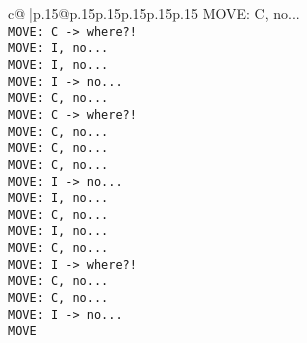 \documentclass{article}
\begin{document}
{\begin{supertabular}{c@{$\;$}|p{.15\linewidth}@{}p{.15\linewidth}p{.15\linewidth}p{.15\linewidth}p{.15\linewidth}p{.15\linewidth}}
{{{ MOVE: C, no...\\ \tt  MOVE: C -> where?!\\ \tt  MOVE: I, no...\\ \tt  MOVE: I, no...\\ \tt  MOVE: I -> no...\\ \tt  MOVE: C, no...\\ \tt  MOVE: C -> where?!\\ \tt  MOVE: C, no...\\ \tt  MOVE: C, no...\\ \tt  MOVE: C, no...\\ \tt  MOVE: I -> no...\\ \tt  MOVE: I, no...\\ \tt  MOVE: C, no...\\ \tt  MOVE: I, no...\\ \tt  MOVE: C, no...\\ \tt  MOVE: I -> where?!\\ \tt  MOVE: C, no...\\ \tt  MOVE: C, no...\\ \tt  MOVE: I -> no...\\ \tt  MOVE}}}
\end{supertabular}}
\end{document}
